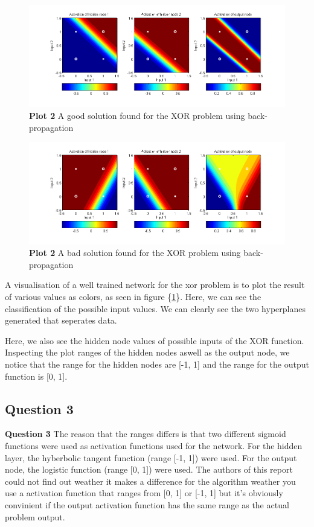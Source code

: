 \documentclass[a4paper]{article}
\begin{document}
\begin{figure}[h!] %
	\caption{\label{fig:good_bprop_xor_plot}\textbf{Plot 2} A good solution found for the XOR problem using back-propagation}
	\includegraphics[scale=0.55]{good_bprop_xor_plot.png}
\end{figure}
\begin{figure}[h!] %
	\caption{\label{fig:bad_bprop_xor_plot}\textbf{Plot 2} A bad solution found for the XOR problem using back-propagation}
	\includegraphics[scale=0.55]{bad_bprop_xor_plot.png}
\end{figure}
A visualisation of a well trained network for the xor problem  
is to plot the result of various values 
as colors, as seen in figure \{\ref{fig:good_bprop_xor_plot}\}. 
Here, we can see the classification of the possible input values. We can 
clearly see the two hyperplanes generated that seperates data. 

Here, we also see the hidden node values of possible inputs of the XOR function.
Inspecting the plot ranges of the hidden nodes aswell as the output node, we notice that
the range for the hidden nodes are [-1, 1] and the range for the output function is [0, 1].
\subsection*{Question 3}
\textbf{Question 3} The reason that the ranges differs is that two 
different sigmoid functions were used as activation functions used for the network. 
For the hidden layer, the hyberbolic tangent function (range [-1, 1]) were used. 
For the output node, the logistic function (range [0, 1]) were used. The authors of 
this report could not find out weather it makes a difference for the algorithm weather 
you use a activation function that ranges from [0, 1] or [-1, 1] but it's obviously 
convinient if the output activation function has the same range as the actual problem 
output. 
\end{document}
